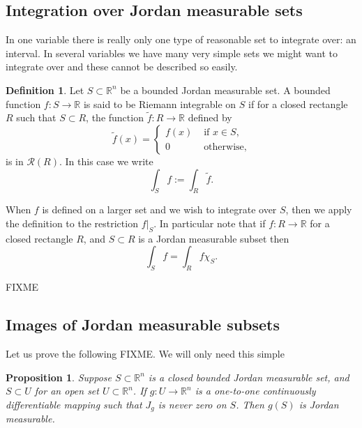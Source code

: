 \documentclass[12pt]{book}
\newcommand{\R}{{\mathbb{R}}}
\newcommand{\sR}{{\mathcal{R}}}
\theoremstyle{plain}
\newtheorem{prop}[thm]{Proposition}
\theoremstyle{remark}
\theoremstyle{definition}
\newtheorem{defn}[thm]{Definition}
\theoremstyle{exercise}
\theoremstyle{example}
\begin{document}
\subsection{Integration over Jordan measurable sets}

In one variable there is really only one type of reasonable set to integrate over:
an interval.   In several variables we have many very simple sets we might
want to integrate over and these cannot be described so easily.

\begin{defn}
Let $S \subset \R^n$ be a bounded Jordan measurable set.
A bounded function $f \colon S \to \R$
is said to be Riemann integrable on $S$ if for a closed rectangle $R$
such that $S \subset R$, the function $\widetilde{f} \colon R \to \R$
defined  by
\begin{equation*}
\widetilde{f}(x) =
\begin{cases}
f(x) & \text{ if $x \in S$}, \\
0 & \text{ otherwise},
\end{cases}
\end{equation*}
is in $\sR(R)$.  In this case we write
\begin{equation*}
\int_S f := \int_R \widetilde{f}.
\end{equation*}
\end{defn}

When $f$ is defined on a larger set and we wish to integrate over $S$, then
we apply the definition to the restriction $f|_S$.  In particular note that
if $f \colon R \to \R$ for a closed rectangle $R$, and $S \subset R$ is
a Jordan measurable subset then
\begin{equation*}
\int_S f = \int_R f \chi_S .
\end{equation*}

FIXME

\subsection{Images of Jordan measurable subsets}

Let us prove the following FIXME.  We will only need this simple

\begin{prop}
Suppose $S \subset \R^n$ is a closed bounded Jordan measurable set,
and $S \subset U$ for an open set $U \subset \R^n$.
If
$g \colon U \to \R^n$ is a one-to-one
continuously differentiable mapping such that
$J_g$ is never zero on $S$.
Then $g(S)$ is Jordan measurable.
\end{prop}
\end{document}
